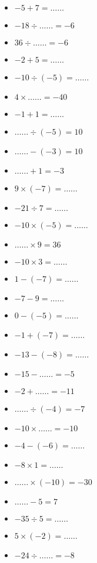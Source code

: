 \begin{multicols}{3}\noindent
  \begin{itemize}[label={$\bullet$}]
    \item $-5 + 7 = \ldots\ldots$
    \item $-18 \div \ldots\ldots = -6$
    \item $36 \div \ldots\ldots = -6$
    \item $-2 + 5 = \ldots\ldots$
    \item $-10 \div \left( -5\right) = \ldots\ldots$
    \item $4 \times \ldots\ldots = -40$
    \item $-1 + 1 = \ldots\ldots$
    \item $\ldots\ldots \div \left( -5\right) = 10$
    \item $\ldots\ldots - \left( -3\right) = 10$
    \item $\ldots\ldots + 1 = -3$
    \item $9 \times \left( -7\right) = \ldots\ldots$
    \item $-21 \div 7 = \ldots\ldots$
    \item $-10 \times \left( -5\right) = \ldots\ldots$
    \item $\ldots\ldots \times 9 = 36$
    \item $-10 \times 3 = \ldots\ldots$
    \item $1 - \left( -7\right) = \ldots\ldots$
    \item $-7 - 9 = \ldots\ldots$
    \item $0 - \left( -5\right) = \ldots\ldots$
    \item $-1 + \left( -7\right) = \ldots\ldots$
    \item $-13 - \left( -8\right) = \ldots\ldots$
    \item $-15 - \ldots\ldots = -5$
    \item $-2 + \ldots\ldots = -11$
    \item $\ldots\ldots \div \left( -4\right) = -7$
    \item $-10 \times \ldots\ldots = -10$
    \item $-4 - \left( -6\right) = \ldots\ldots$
    \item $-8 \times 1 = \ldots\ldots$
    \item $\ldots\ldots \times \left( -10\right) = -30$
    \item $\ldots\ldots - 5 = 7$
    \item $-35 \div 5 = \ldots\ldots$
    \item $5 \times \left( -2\right) = \ldots\ldots$
    \item $-24 \div \ldots\ldots = -8$
   \end{itemize}
\end{multicols}


